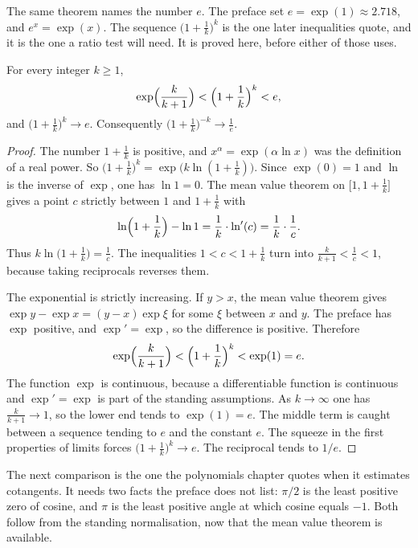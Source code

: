 The same theorem names the number $e$. The preface set $e=\exp(1)\approx 2.718$, and $e^x=\exp(x)$. The sequence $\bigl(1+\frac1k\bigr)^k$ is the one later inequalities quote, and it is the one a ratio test will need. It is proved here, before either of those uses.

\begin{proposition}\label{prop:e-limit}
For every integer $k\ge 1$,
\[
\exp\Bigl(\frac k{k+1}\Bigr)<\Bigl(1+\frac1k\Bigr)^k<e,
\]
and $\bigl(1+\frac1k\bigr)^k\to e$. Consequently $\bigl(1+\frac1k\bigr)^{-k}\to\frac1e$.
\end{proposition}
\begin{proof}
The number $1+\frac1k$ is positive, and $x^\alpha=\exp(\alpha\ln x)$ was the definition of a real power. So $\bigl(1+\frac1k\bigr)^k=\exp\bigl(k\ln(1+\frac1k)\bigr)$. Since $\exp(0)=1$ and $\ln$ is the inverse of $\exp$, one has $\ln 1=0$. The mean value theorem on $\bigl[1,1+\frac1k\bigr]$ gives a point $c$ strictly between $1$ and $1+\frac1k$ with
\[
\ln\Bigl(1+\frac1k\Bigr)-\ln 1=\frac1k\cdot\ln'(c)=\frac1k\cdot\frac1c.
\]
Thus $k\ln\bigl(1+\frac1k\bigr)=\frac1c$. The inequalities $1<c<1+\frac1k$ turn into $\frac k{k+1}<\frac1c<1$, because taking reciprocals reverses them.

The exponential is strictly increasing. If $y>x$, the mean value theorem gives $\exp y-\exp x=(y-x)\exp\xi$ for some $\xi$ between $x$ and $y$. The preface has $\exp$ positive, and $\exp'=\exp$, so the difference is positive. Therefore
\[
\exp\Bigl(\frac k{k+1}\Bigr)<\Bigl(1+\frac1k\Bigr)^k<\exp(1)=e.
\]
The function $\exp$ is continuous, because a differentiable function is continuous and $\exp'=\exp$ is part of the standing assumptions. As $k\to\infty$ one has $\frac k{k+1}\to 1$, so the lower end tends to $\exp(1)=e$. The middle term is caught between a sequence tending to $e$ and the constant $e$. The squeeze in the first properties of limits forces $\bigl(1+\frac1k\bigr)^k\to e$. The reciprocal tends to $1/e$.
\end{proof}

The next comparison is the one the polynomials chapter quotes when it estimates cotangents. It needs two facts the preface does not list: $\pi/2$ is the least positive zero of cosine, and $\pi$ is the least positive angle at which cosine equals $-1$. Both follow from the standing normalisation, now that the mean value theorem is available.

